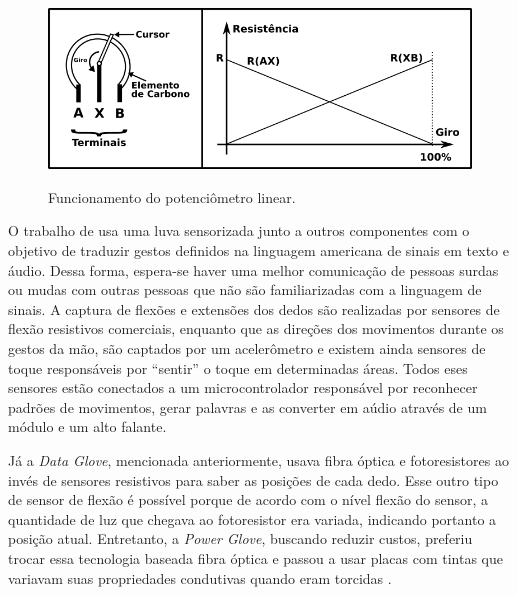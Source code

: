 \documentclass[
	12pt,				%
	openright,			%
	oneside,			%
	a4paper,			%
	english,			%
	brazil				%
	]{abntex2}
\begin{document}
		\begin{figure}[h!]
			\centering
  		\caption{Funcionamento do potenciômetro linear.}
  		\includegraphics[width=12cm]{./figures/potentiometer1.png}
  		\label{Fig:potentiometer1}
		\end{figure}

		O trabalho de \cite{anbarasi2013deafmute} usa uma luva sensorizada junto a outros componentes com o objetivo de traduzir gestos definidos na linguagem americana de sinais em texto e áudio. Dessa forma, espera-se haver uma melhor comunicação de pessoas surdas ou mudas com outras pessoas que não são familiarizadas com a linguagem de sinais. A captura de flexões e extensões dos dedos são realizadas por sensores de flexão resistivos comerciais, enquanto que as direções dos movimentos durante os gestos da mão, são captados por um acelerômetro e existem ainda sensores de toque responsáveis por ``sentir'' o toque em determinadas áreas. Todos eses sensores estão conectados a um microcontrolador responsável por reconhecer padrões de movimentos, gerar palavras e as converter em aúdio através de um módulo e um alto falante. 

		Já a \textit{Data Glove}, mencionada anteriormente, usava fibra óptica e fotoresistores ao invés de sensores resistivos para saber as posições de cada dedo. Esse outro tipo de sensor de flexão é possível porque de acordo com o nível flexão do sensor, a quantidade de luz que chegava ao fotoresistor era variada, indicando portanto a posição atual. Entretanto, a \textit{Power Glove}, buscando reduzir custos, preferiu trocar essa tecnologia baseada fibra óptica e passou a usar placas com tintas que variavam suas propriedades condutivas quando eram torcidas \cite{dana1989powerglove}. 

\end{document}
